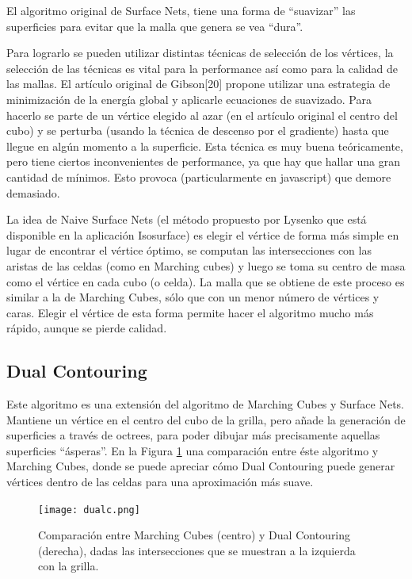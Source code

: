 \documentclass[12pt]{article}
\begin{document}
El algoritmo original de Surface Nets\cite{surfacenets}, tiene una forma de “suavizar” las superficies para evitar  que la malla que genera se vea “dura”.

Para lograrlo se pueden utilizar distintas técnicas de selección de los vértices, la selección de las técnicas es vital para la performance así como para la calidad de las mallas. El artículo original de Gibson[20]  propone utilizar una estrategia de minimización de la energía global y aplicarle ecuaciones de suavizado. Para hacerlo se parte de un vértice elegido al azar (en el artículo original el centro del cubo)  y se perturba (usando la técnica de descenso por el gradiente) hasta que llegue en algún momento a la superficie. Esta técnica es muy buena teóricamente, pero tiene ciertos inconvenientes de performance, ya que hay que hallar una gran cantidad de mínimos. Esto provoca (particularmente en javascript) que demore demasiado.

La idea de Naive Surface Nets (el método propuesto por Lysenko\cite{mykola2} que está disponible en la aplicación Isosurface) es elegir el vértice de forma más simple  en lugar de encontrar el vértice óptimo, se computan las intersecciones con las aristas de las celdas (como en Marching cubes) y luego se toma su centro de masa como el vértice en cada cubo (o celda). La malla que se obtiene de este proceso es similar a la de Marching Cubes, sólo que con un menor número de vértices y caras. Elegir el vértice de esta forma permite hacer el algoritmo mucho más rápido, aunque se pierde calidad.
\subsection{Dual Contouring}
Este algoritmo es una extensión del algoritmo de Marching Cubes y Surface Nets. Mantiene un vértice en el centro del cubo de la grilla, pero añade la generación de superficies a través de octrees, para poder dibujar más precisamente aquellas superficies “ásperas”\cite{dualcontour}. En la Figura \ref{dual} una comparación entre éste algoritmo y Marching Cubes, donde se puede apreciar cómo Dual Contouring puede generar vértices dentro de las celdas para una aproximación más suave.

\begin{figure}[h!]
\texttt{[image: dualc.png]}
\caption{ Comparación entre Marching Cubes (centro) y Dual Contouring (derecha), dadas las intersecciones que se muestran a la izquierda con la grilla.}
\label{dual}
\end{figure}
\end{document}
